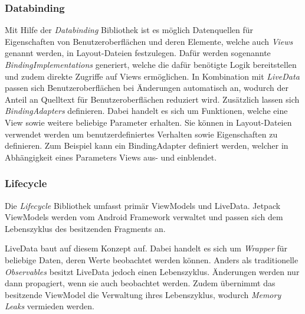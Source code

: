 \subsubsection{Databinding}
\label{subsubsec:app:jetpack:databinding}
Mit Hilfe der \textit{Databinding} Bibliothek ist es möglich Datenquellen für Eigenschaften von Benutzeroberflächen und deren Elemente, welche auch \textit{Views} genannt werden, in Layout-Dateien festzulegen.
Dafür werden sogenannte \textit{BindingImplementations} generiert, welche die dafür benötigte Logik bereitstellen und zudem direkte Zugriffe auf Views ermöglichen.
In Kombination mit \textit{LiveData} passen sich Benutzeroberflächen bei Änderungen automatisch an, wodurch der Anteil an Quelltext für Benutzeroberflächen reduziert wird.
Zusätzlich lassen sich \textit{BindingAdapters} definieren.
Dabei handelt es sich um Funktionen, welche eine View sowie weitere beliebige Parameter erhalten.
Sie können in Layout-Dateien verwendet werden um benutzerdefiniertes Verhalten sowie Eigenschaften zu definieren.
Zum Beispiel kann ein BindingAdapter definiert werden, welcher in Abhängigkeit eines Parameters Views aus- und einblendet.

\subsubsection{Lifecycle}
\label{subsubsec:app:jetpack:lifecycle}
Die \textit{Lifecycle} Bibliothek umfasst primär ViewModels und LiveData.
Jetpack ViewModels werden vom Android Framework verwaltet und passen sich dem Lebenszyklus des besitzenden Fragments an.

LiveData baut auf diesem Konzept auf.
Dabei handelt es sich um \textit{Wrapper} für beliebige Daten, deren Werte beobachtet werden können.
Anders als traditionelle \textit{Observables} besitzt LiveData jedoch einen Lebenszyklus.
Änderungen werden nur dann propagiert, wenn sie auch beobachtet werden.
Zudem übernimmt das besitzende ViewModel die Verwaltung ihres Lebenszyklus, wodurch \textit{Memory Leaks} vermieden werden.

